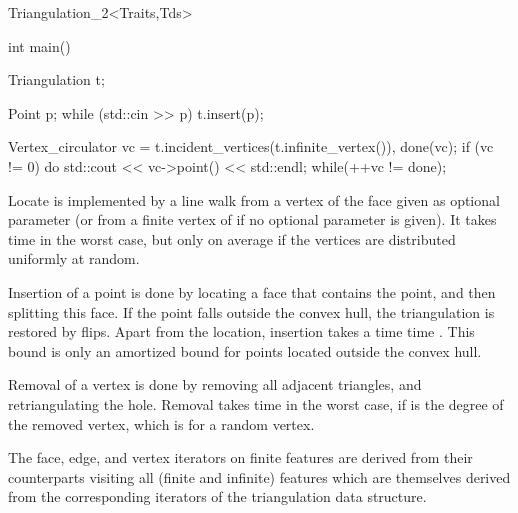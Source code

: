 \begin{ccClassTemplate}{Triangulation_2<Traits,Tds>}
\begin{cprog}
int main() {
  Triangulation t;
    
  Point p;
  while (std::cin >> p){
    t.insert(p);
  }
  
  Vertex_circulator vc = t.incident_vertices(t.infinite_vertex()),
    done(vc);
  if (vc != 0) {
    do{
      std::cout << vc->point() << std::endl;
    }while(++vc != done);
  }
}
\end{cprog} 


Locate is implemented by a line walk from a vertex of the face given
as optional parameter (or from a finite vertex of
 if no optional parameter is given). It takes
time  in the worst case, but only 
on average if the vertices are distributed uniformly at random.

Insertion of a point is done by locating a face that contains the
point, and then splitting this face.
If the point falls outside the convex hull, the triangulation
 is restored by flips.  Apart from the location, insertion takes a time 
time . This bound is only an amortized bound
for points located outside the convex hull.

Removal of a vertex is done by removing all adjacent triangles, and
retriangulating the hole. Removal takes time  in the worst
case, if  is the degree of the removed vertex,
which is  for a random vertex.

The face, edge, and vertex iterators on finite features
are derived from their counterparts visiting all (finite and infinite)
features which are themselves derived from the corresponding iterators
of the triangulation data structure.

\end{ccClassTemplate}


